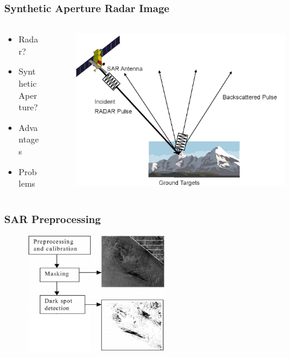 \documentclass{beamer}
\begin{document}
\begin{frame}
\frametitle{Synthetic Aperture Radar Image}

	\begin{columns}[T]
    	\begin{column}{.4\textwidth}

			\begin{itemize}
				\item Radar?
				\item Synthetic Aperture?
				\item Advantages
				\item Problems

			\end{itemize}
		\end{column}
		\begin{column}{.6\textwidth}
			\begin{figure}
				\centering
   				\includegraphics[width=\textwidth]{./img/SARexplained.png}
			\end{figure}
		\end{column}
	\end{columns}

\end{frame}


\begin{frame}
\frametitle{SAR Preprocessing}

	\begin{figure}
		\centering
    	\includegraphics[width=60mm,scale=1]{./img/preprocessing_diagram.png}
	\end{figure}
	
\end{frame}
\end{document}

